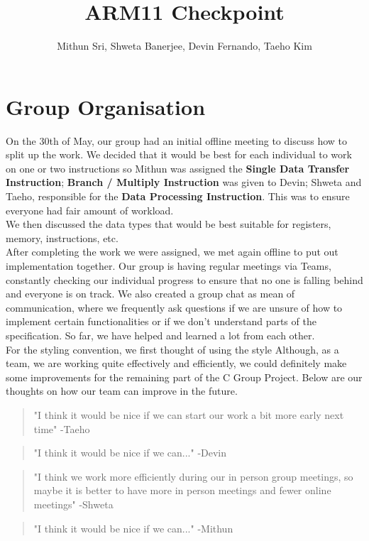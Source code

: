 \documentclass[11pt]{article}
\begin{document}
\title{ARM11 Checkpoint}
\author{Mithun Sri, Shweta Banerjee, Devin Fernando, Taeho Kim}

\maketitle

\section{Group Organisation}


\-\hspace{1cm}On the 30th of May, our group had an initial offline meeting to discuss how to split up the work. We decided that it would be best for each individual to work on one or two instructions so Mithun was assigned the {\bf Single Data Transfer Instruction}; {\bf Branch / Multiply Instruction} was given to Devin; Shweta and Taeho, responsible for the {\bf Data Processing Instruction}. This was to ensure everyone had fair amount of workload. \\
\-\hspace{1cm}We then discussed the data types that would be best suitable for registers, memory, instructions, etc. \\
\-\hspace{1cm}After completing the work we were assigned, we met again offline to put out implementation together.
\-\hspace{1cm}Our group is having regular meetings via Teams, constantly checking our individual progress to ensure that no one is falling behind and everyone is on track. We also created a group chat as mean of communication, where we frequently ask questions if we are unsure of how to implement certain functionalities or if we don't understand parts of the specification. So far, we have helped and learned a lot from each other.\\
\-\hspace{1cm}For the styling convention, we first thought of using the style 
\-\hspace{1cm}Although, as a team, we are working quite effectively and efficiently, we could definitely make some improvements for the remaining part of the C Group Project. Below are our thoughts on how our team can improve in the future.

\begin{quote}
  "I think it would be nice if we can start our work a bit more early next time" -Taeho
\end{quote}
\begin{quote}
  "I think it would be nice if we can..." -Devin
\end{quote}
\begin{quote}
  "I think we work more efficiently during our in person group meetings, so maybe it is better to have more in person meetings and fewer online meetings" -Shweta
\end{quote}
\begin{quote}
  "I think it would be nice if we can..." -Mithun
\end{quote}
\end{document}
